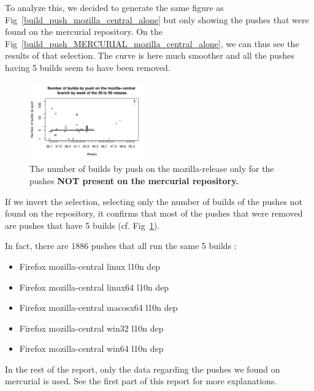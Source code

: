 To analyze this, we decided to generate the same figure as Fig~\ref{build_push_mozilla_central_alone} but only showing the pushes that were found on the mercurial repository. On the Fig~\ref{build_push_MERCURIAL_mozilla_central_alone}, we can thus see the results of that selection. The curve is here much smoother and all the pushes having 5 builds seem to have been removed.

\begin{figure}[!h]
    \centering
    \includegraphics[width=0.45\textwidth]{img/build_push_COUNT_mozilla_central.pdf}
    \caption{The number of builds by push on the mozilla-release only for the pushes \textbf{NOT present on the mercurial repository.}}
    \label{build_push_COUNT_mozilla_central_alone}
\end{figure}

If we invert the selection, selecting only the number of builds of the pushes not found on the repository, it confirms that most of the pushes that were removed are pushes that have 5 builds (cf. Fig~\ref{build_push_COUNT_mozilla_central_alone}).

In fact, there are 1886 pushes that all run the same 5 builds : 

\begin{itemize}
    \item Firefox mozilla-central linux l10n dep  
    \item Firefox mozilla-central linux64 l10n dep 
    \item Firefox mozilla-central macosx64 l10n dep    
    \item Firefox mozilla-central win32 l10n dep    
    \item Firefox mozilla-central win64 l10n dep 
\end{itemize}




In the rest of the report, only the data regarding the pushes we found on mercurial is used. See the first part of this report for more explanations.

\newpage